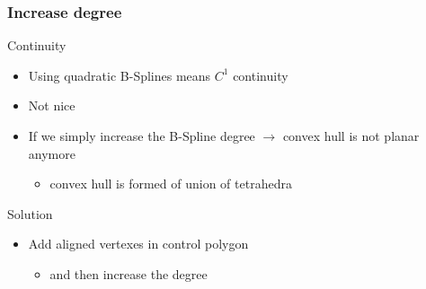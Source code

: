 \begin{frame}
  \frametitle{Increase degree}
  \begin{block}{Continuity}
    \begin{itemize}
    \item Using \alert{quadratic} B-Splines means \alert{$C^1$} continuity\pause
    \item[\xmark] Not nice
    \end{itemize}
  \end{block}\pause
  \begin{itemize}
  \item[\xmark] If we simply \alert{increase} the B-Spline degree \alert{$\rightarrow$} convex hull is not
    \alert{planar} anymore\pause
    \begin{itemize}
    \item convex hull is formed of union of \alert{tetrahedra}\pause
    \end{itemize}
  \end{itemize}
  \begin{block}{Solution}
    \begin{itemize}
    \item \alert{Add} aligned vertexes in control polygon\pause
      \begin{itemize}
      \item and then \alert{increase} the degree
      \end{itemize}
    \end{itemize}
  \end{block}
\end{frame}

